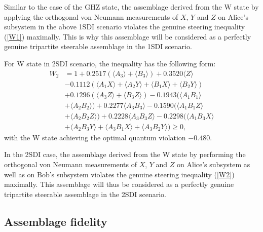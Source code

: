 \documentclass[reprint,superscriptaddress,nofootinbib,amsmath,amssymb,aps,pra,longbibliography]{revtex4-1}
\begin{document}
Similar to the case of the GHZ state, the assemblage derived from the W state by applying the orthogonal von Neumann measurements of $X$, $Y$ and $Z$ on Alice's subsystem in the above 1SDI scenario violates the genuine steering inequality (\ref{W1}) maximally. This is why this assemblage will be considered as a perfectly genuine tripartite steerable assemblage in the 1SDI scenario.

For W state in 2SDI scenario, the inequality has the following form: 
\begin{align}
W_2 &= 1 + 0.2517(\langle A_3 \rangle + \langle B_3 \rangle) + 0.3520  \langle Z\rangle \nonumber \\
&- 0.1112 ( \langle A_1 X \rangle + \langle A_2 Y \rangle + \langle B_1 X  \rangle + \langle B_2 Y  \rangle ) \nonumber \\
&+ 0.1296 ( \langle A_3 Z \rangle + \langle B_3 Z \rangle)  - 0.1943 ( \langle A_1B_1\rangle \nonumber \\
&+ \langle A_2B_2 \rangle ) + 0.2277  \langle A_3B_3\rangle  - 0.1590( \langle A_1B_1Z\rangle \nonumber \\
&+ \langle A_2B_2Z\rangle ) + 0.2228 \langle A_3B_3Z\rangle   -0.2298 (\langle A_1B_3X\rangle \nonumber \\
&+ \langle A_2B_3Y\rangle + \langle A_3B_1X\rangle + \langle A_3B_2 Y\rangle )  \geq 0,
\label{W2}
\end{align}
 with the  W state achieving the optimal quantum violation $-0.480$. %

In the 2SDI case,  the assemblage derived from the W state by performing the orthogonal von Neumann measurements of $X$, $Y$ and $Z$ on Alice's subsystem as well as on Bob's subsystem  violates the genuine steering inequality (\ref{W2}) maximally. This assemblage will thus be considered as a perfectly genuine tripartite steerable assemblage in the 2SDI scenario.

\subsection{Assemblage fidelity}
\end{document}
